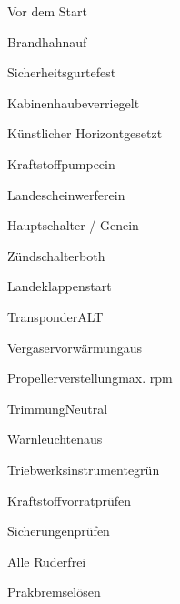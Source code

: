 \begin{memoryitem}
  \begin{checklist}{Vor dem Start}
    \item{Brandhahn}{auf}
    \item{Sicherheitsgurte}{fest}
    \item{Kabinenhaube}{verriegelt}
    \item{Künstlicher Horizont}{gesetzt}
    \item{Kraftstoffpumpe}{ein}
    \item{Landescheinwerfer}{ein}
    \item{Hauptschalter / Gen}{ein}
    \item{Zündschalter}{both}
    \item{Landeklappen}{start}
    \item{Transponder}{ALT}
    \item{Vergaservorwärmung}{aus}
    \item{Propellerverstellung}{max. rpm}
    \item{Trimmung}{Neutral}
    \item{Warnleuchten}{aus}
    \item{Triebwerksinstrumente}{grün}
    \item{Kraftstoffvorrat}{prüfen}
    \item{Sicherungen}{prüfen}
    \item{Alle Ruder}{frei}
    \item{Prakbremse}{lösen}
  \end{checklist}
\end{memoryitem}

